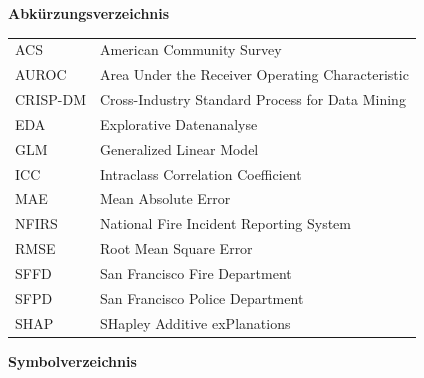 \documentclass[12pt,a4paper]{article}
\begin{document}

\newpage
\tableofcontents

\newpage
\listoffigures

\newpage
{}
{\bfseries\normalsize Abkürzungsverzeichnis}
\vspace{6pt}

\begin{tabular}{@{}ll}
ACS & American Community Survey \\[12pt]
AUROC & Area Under the Receiver Operating Characteristic \\[12pt]
CRISP-DM & Cross-Industry Standard Process for Data Mining \\[12pt]
EDA & Explorative Datenanalyse \\[12pt]
GLM & Generalized Linear Model \\[12pt]
ICC & Intraclass Correlation Coefficient \\[12pt]
MAE & Mean Absolute Error \\[12pt]
NFIRS & National Fire Incident Reporting System \\[12pt]
RMSE & Root Mean Square Error \\[12pt]
SFFD & San Francisco Fire Department \\[12pt]
SFPD & San Francisco Police Department \\[12pt]
SHAP & SHapley Additive exPlanations \\[12pt]
\end{tabular}


\newpage
\listoftables

\newpage
{}
{}
\listofquellcodes

\newpage
{}
{}
\listofformeln

\newpage
{}
{\bfseries\normalsize Symbolverzeichnis}
\vspace{6pt}
\end{document}
